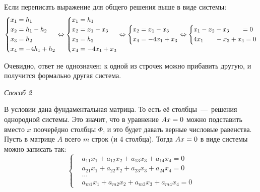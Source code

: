 \documentclass[a4paper,12pt]{article}
\begin{document}
\begin{solution}
    Если переписать выражение для общего решения выше в виде системы:
    \[
      \left\{
        \begin{aligned}
          &x_1 = h_1\\
          &x_2 = h_1 - h_2\\
          &x_3 = h_2\\
          &x_4 = -4h_1 + h_2
        \end{aligned}
      \right. \Leftrightarrow \left\{
        \begin{aligned}
          &x_1 = h_1\\
          &x_2 = x_1 - x_3\\
          &x_3 = h_2\\
          &x_4 = -4x_1 + x_3
        \end{aligned}
      \right. \Leftrightarrow \left\{
        \begin{aligned}
          &x_2 = x_1 - x_3\\
          &x_4 = -4x_1 + x_3
        \end{aligned}
      \right. \Leftrightarrow \left\{
        \begin{aligned}
          &x_1 - x_2 - x_3 \hphantom{+ x_4} = 0\\
          &4x_1 \hphantom{+ x_2} - x_3 + x_4 = 0
        \end{aligned}
      \right.
    \]
    
    Очевидно, ответ не однозначен: к одной из строчек можно прибавить другую, и получится формально другая система.
    
    \bigskip
    
    \emph{Способ 2}
    
    В условии дана фундаментальная матрица.
    То есть её столбцы~---~решения однородной системы.
    Это значит, что в уравнение $Ax \hm= 0$ можно подставить вместо $x$ поочерёдно столбцы $\Phi$, и это будет давать верные числовые равенства.
    Пусть в матрице $A$ всего $m$ строк (и $4$ столбца).
    Тогда $Ax \hm= 0$ в виде системы можно записать так:
    \[
      \left\{
        \begin{aligned}
          &a_{11} x_1 + a_{12} x_2 + a_{13} x_3 + a_{14} x_4 = 0\\
          &a_{21} x_1 + a_{22} x_2 + a_{23} x_3 + a_{24} x_4 = 0\\
          &\ldots\\
          &a_{m1} x_1 + a_{m2} x_2 + a_{m3} x_3 + a_{m4} x_4 = 0
        \end{aligned}
      \right.
    \]
    

\end{solution}
\end{document}
